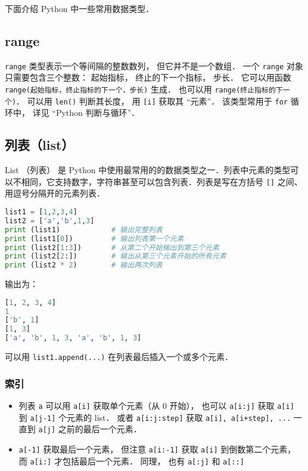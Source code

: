 

下面介绍 Python 中一些常用数据类型． 

\subsection{range}
\verb|range| 类型表示一个等间隔的整数数列， 但它并不是一个数组． 一个 \verb|range| 对象只需要包含三个整数： 起始指标， 终止的下一个指标， 步长． 它可以用函数 \verb|range(起始指标，终止指标的下一个，步长)| 生成． 也可以用 \verb|range(终止指标的下一个)|． 可以用 \verb|len()| 判断其长度， 用 \verb|[i]| 获取其 “元素”． 该类型常用于 \verb|for| 循环中， 详见 “Python 判断与循环”．

\subsection{列表（list）}
List （列表） 是 Python 中使用最常用的的数据类型之一．列表中元素的类型可以不相同，它支持数字，字符串甚至可以包含列表．列表是写在方括号 \verb|[]| 之间、用逗号分隔开的元素列表．
\begin{lstlisting}[language=python]
list1 = [1,2,3,4]
list2 = ['a','b',1,3]
print (list1)            # 输出完整列表
print (list1[0])         # 输出列表第一个元素
print (list2[1:3])       # 从第二个开始输出到第三个元素
print (list2[2:])        # 输出从第三个元素开始的所有元素
print (list2 * 2)        # 输出两次列表
\end{lstlisting}
输出为：
\begin{lstlisting}[language=python]
[1, 2, 3, 4]
1
['b', 1]
[1, 3]
['a', 'b', 1, 3, 'a', 'b', 1, 3]
\end{lstlisting}
可以用 \verb|list1.append(...)| 在列表最后插入一个或多个元素．

\subsubsection{索引}
\begin{itemize}
\item 列表 \verb|a| 可以用 \verb|a[i]| 获取单个元素（从 0 开始）， 也可以 \verb|a[i:j]| 获取 \verb|a[i]| 到 \verb|a[j-1]| 个元素的 list． 或者 \verb|a[i:j:step]| 获取 \verb|a[i], a[i+step], ...| 一直到 \verb|a[j]| 之前的最后一个元素． 
\item \verb|a[-1]| 获取最后一个元素， 但注意 \verb|a[i:-1]| 获取 \verb|a[i]| 到倒数第二个元素， 而 \verb|a[i:]| 才包括最后一个元素． 同理， 也有 \verb|a[:j]| 和 \verb|a[::]|
\end{itemize}


